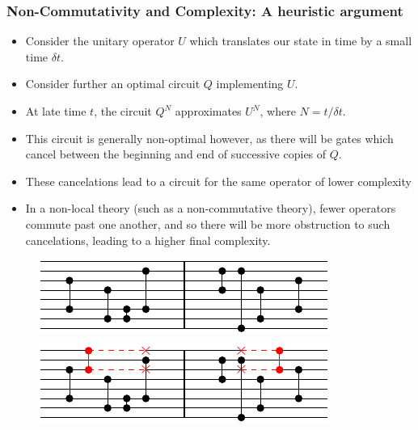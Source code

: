 \documentclass[8pt,aspectratio=169]{beamer}
\begin{document}
\begin{frame}
\frametitle{Non-Commutativity and Complexity: A heuristic argument}

\begin{minipage}[t]{0.5\linewidth}

\begin{itemize}

\item Consider the unitary operator $U$ which translates our state in time by a small time $\delta t$. 

\item Consider further an optimal circuit $Q$ implementing $U$.

\item At late time $t$, the circuit $Q^N$ approximates $U^N$, where $N= t/\delta t$.

\item This circuit is generally non-optimal however, as there will be gates which cancel between the beginning and end of successive copies of $Q$.

\item These cancelations lead to a circuit for the same operator of lower complexity

\item In a non-local theory (such as a non-commutative theory), fewer operators commute past one another, and so there will be more obstruction to such cancelations, leading to a higher final complexity.

\end{itemize}

\end{minipage}\hfill
%
\begin{minipage}[t]{0.48\linewidth}

\begin{figure}
    \begin{center}
    
        \includegraphics[scale=1]{animation/animation_4}    
        
        \vspace{2mm}
        
        \includegraphics[scale=1]{animation/animation_5}    
    

\end{center}
\end{figure}
\end{minipage}
\end{frame}
\end{document}
